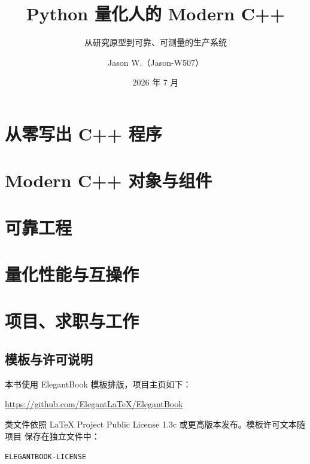 \documentclass[lang=cn,newtx,10pt,scheme=chinese,color=blue]{elegantbook}
\title{Python 量化人的 Modern C++}
\subtitle{从研究原型到可靠、可测量的生产系统}
\author{Jason W.（Jason-W507）}
\institute{Modern C++ 量化教程项目 · Quant Developer / Research Engineer}
\date{2026 年 7 月}
\begin{document}
\maketitle
\frontmatter

\tableofcontents

\mainmatter
\part{从零写出 C++ 程序}






\part{Modern C++ 对象与组件}






\part{可靠工程}



\part{量化性能与互操作}





\part{项目、求职与工作}



\appendix









\backmatter
\printindex
\printbibliography[heading=bibintoc,title={参考文献}]
\chapter*{模板与许可说明}
本书使用 ElegantBook 模板排版，项目主页如下：
\begin{center}
  \url{https://github.com/ElegantLaTeX/ElegantBook}
\end{center}
类文件依照 LaTeX Project Public License 1.3c 或更高版本发布。模板许可文本随项目
保存在独立文件中：
\begin{center}
  \texttt{ELEGANTBOOK-LICENSE}
\end{center}
\end{document}
